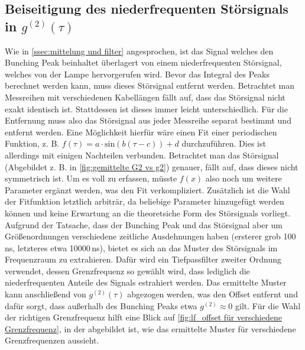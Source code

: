 \subsection{Beiseitigung des niederfrequenten Störsignals in $g^{(2)}(\tau)$}
\label{ssec:Beseitigung des niederfrequenten Störsignals}
Wie in \autoref{ssec:mittelung und filter} angesprochen, ist das Signal welches den Bunching Peak beinhaltet überlagert von einem niederfrequenten Störsignal, welches von der Lampe hervorgerufen wird. 
Bevor das Integral des Peaks berechnet werden kann, muss dieses Störsignal entfernt werden. 
Betrachtet man Messreihen mit verschiedenen Kabellängen fällt auf, dass das Störsignal nicht exakt identisch ist. 
Stattdessen ist dieses immer leicht unterschiedlich. 
Für die Entfernung muss also das Störsignal aus jeder Messreihe separat bestimmt und entfernt werden. 
Eine Möglichkeit hierfür wäre einen Fit einer periodischen Funktion, z. B. $f(\tau) = a\cdot\mathrm{sin}(b(\tau-c))+d$ durchzuführen. 
Dies ist allerdings mit einigen Nachteilen verbunden. 
Betrachtet man das Störsignal (Abgebildet z. B. in \autoref{fig:gemittelte G2 vs g2}) genauer, fällt auf, dass dieses nicht symmetrisch ist. 
Um es voll zu erfassen, müsste $f(x)$ also noch um weitere Parameter ergänzt werden, was den Fit verkompliziert. 
Zusätzlich ist die Wahl der Fitfunktion letztlich arbiträr, da beliebige Parameter hinzugefügt werden können und keine Erwartung an die theoretsiche Form des Störsignals vorliegt. \\
Aufgrund der Tatsache, dass der Bunching Peak und das Störsignal aber um Größenordnungen verschiedene zeitliche Ausdehnungen haben (ersterer grob 100\,ns, letzteres etwa 10000\,ns), bietet es sich an das Muster des Störsignals im Frequenzraum zu extrahieren. 
Dafür wird ein Tiefpassfilter zweiter Ordnung verwendet, dessen Grenzfrequenz so gewählt wird, dass lediglich die niederfrequenten Anteile des Signals estrahiert werden. 
Das ermittelte Muster kann anschließend von $g^{(2)}(\tau)$ abgezogen werden, was den Offset entfernt und dafür sorgt, dass außerhalb des Bunching Peaks etwa $g^{(2)}\approx 0$ gilt. 
Für die Wahl der richtigen Grenzfrequenz hilft eine Blick auf \autoref{fig:lf_offset für verschiedene Grenzfrequenz}, in der abgebildet ist, wie das ermittelte Muster für verschiedene Grenzfrequenzen aussieht. 
